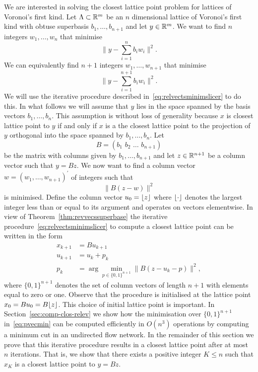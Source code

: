 \documentclass[final,leqno]{siamltex}
\begin{document}
We are interested in solving the closest lattice point problem for lattices of Voronoi's first kind.  Let $\Lambda \subset {\mathbb R}^m$ be an $n$ dimensional lattice of Voronoi's first kind with obtuse superbasis $b_1,\dots,b_{n+1}$ and let $y \in {\mathbb R}^m$.  We want to find $n$ integers $w_1,\dots,w_n$ that minimise
\[
\| y - \sum_{i=1}^n b_i w_i \|^2.
\]
We can equivalently find $n+1$ integers $w_1,\dots,w_{n+1}$ that minimise
\[
\| y - \sum_{i=1}^{n+1} b_i w_i \|^2.
\]
We will use the iterative procedure described in~\eqref{eq:relvectsminimslicer} to do this.  In what follows we will assume that $y$ lies in the space spanned by the basis vectors $b_1,\dots,b_{n}$.  This assumption is without loss of generality because $x$ is closest lattice point to $y$ if and only if $x$ is a the closest lattice point to the projection of $y$ orthogonal into the space spanned by $b_1,\dots,b_{n}$.  Let
\begin{equation}\label{eq:matrxBobtusebasis}
B = (b_1\,\,b_2\,\,\dots\,\,b_{n+1})
\end{equation}
be the matrix with columns given by $b_1,\dots,b_{n+1}$ and let $z \in {\mathbb R}^{n+1}$ be a column vector such that $y = Bz$.  We now want to find a column vector $w = (w_1,\dots,w_{n+1})^\prime$ of integers such that
\begin{equation}\label{eq:tominimise}
\| B(z  -  w) \|^2
\end{equation}
is minimised.  Define the column vector $u_0 = {\left\lfloor z \right\rfloor}$ where ${\left\lfloor \cdot \right\rfloor}$ denotes the largest integer less than or equal to its argument and operates on vectors elementwise. In view of Theorem~\ref{thm:revvecssuperbase} the iterative procedure~\eqref{eq:relvectsminimslicer} to compute a closest lattice point can be written in the form
\begin{align}
x_{k+1} &= B u_{k+1} \label{eq:xseqfirsttype}  \\
u_{k+1} &= u_k + p_k \nonumber \\
p_k &= \arg\min_{p \in \{0,1\}^{n+1}}\| B(z - u_k - p) \|^2, \label{eq:pvecmin}
\end{align}
where $\{0,1\}^{n+1}$ denotes the set of column vectors of length $n+1$ with elements equal to zero or one.  Observe that the procedure is initialised at the lattice point $x_0 = Bu_0 = B{\left\lfloor z \right\rfloor}$.  This choice of initial lattice point is important.  In Section~\ref{sec:comp-clos-relev} we show how the minimisation over $\{0,1\}^{n+1}$ in~\eqref{eq:pvecmin} can be computed efficiently in $O(n^3)$ operations by computing a minimum cut in an undirected flow network.  In the remainder of this section we prove that this iterative procedure results in a closest lattice point after at most $n$ iterations.  That is, we show that there exists a positive integer $K \leq n$ such that $x_K$ is a closest lattice point to $y = Bz$.
\end{document}
